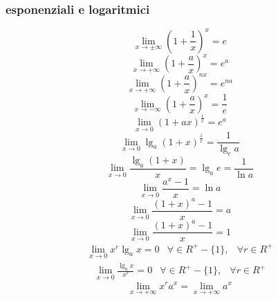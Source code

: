 \documentclass{article}
\begin{document}
\subsubsection{esponenziali e logaritmici}
\begin{multicols}{2}
\begin{equation}
	\lim_{x\to\pm\infty}\left(1+\frac{1}{x}\right)^x=e
\end{equation}
\begin{equation}
	\lim_{x\to+\infty}\left(1+\frac{a}{x}\right)^x=e^a
\end{equation}
\begin{equation}
	\lim_{x\to+\infty}\left(1+\frac{a}{x}\right)^{nx}=e^{na}
\end{equation}
\begin{equation}
	\lim_{x\to-\infty}\left(1+\frac{a}{x}\right)^x=\frac{1}{e}
\end{equation}
\begin{equation}
	\lim_{x\to0}\left(1+ax\right)^{\frac{1}{x}}=e^{a}
\end{equation}
\begin{equation}
	\lim_{x\to0}\lg_a\left(1+x\right)^\frac{1}{x}=\frac{1}{\lg_e a}
\end{equation}
\begin{equation}
	\lim_{x\to0}\frac{\lg_a\left(1+x\right)}{x}=\lg_ae=\frac{1}{\ln a}
\end{equation}
\begin{equation}
	\lim_{x\to0}\frac{a^x-1}{x}=\ln a
\end{equation}
\begin{equation}
	\lim_{x\to0}\frac{\left(1+x\right)^a-1}{x}=a
\end{equation}
\begin{equation}
	\lim_{x\to0}\frac{\left(1+x\right)^a-1}{x}=1
\end{equation}
\begin{equation}
	\begin{matrix}
		\lim_{x\to0}x^r\lg_a x=0&\forall \in R^+-\{1\},&\forall r\in R^+
	\end{matrix}
\end{equation}
\begin{equation}
	\begin{matrix}
		\lim_{x\to0}\frac{\lg_a x}{x^r}=0&\forall \in R^+-\{1\},&\forall r\in R^+
	\end{matrix}
\end{equation}
\begin{equation}
	\lim_{x\to+\infty}x^ra^x=\lim_{x\to+\infty}a^x

\end{equation}
\end{multicols}
\end{document}
